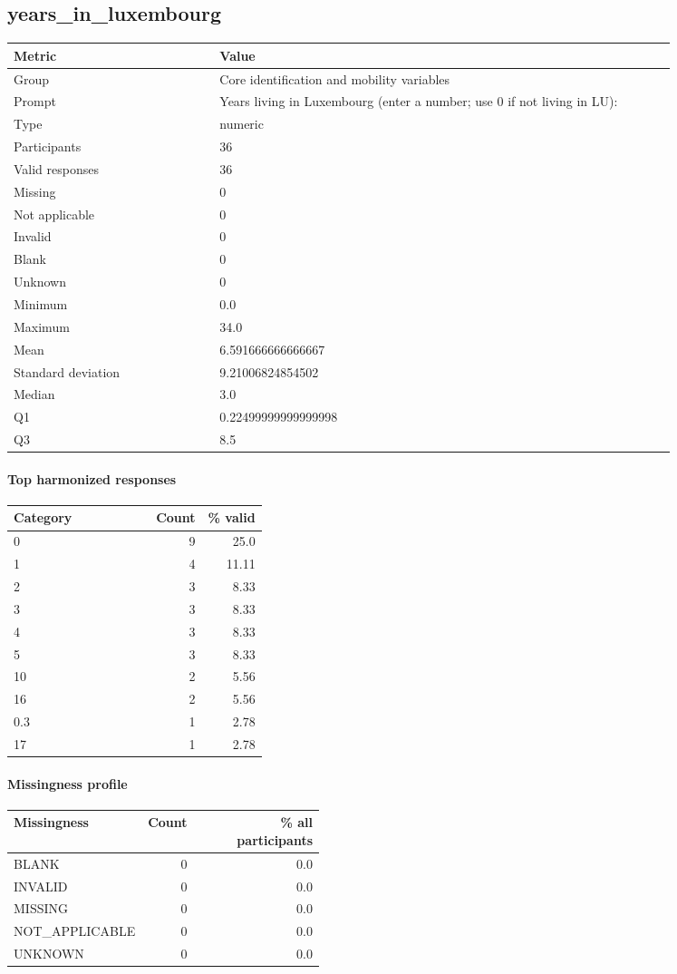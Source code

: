 \subsection*{years\_in\_luxembourg}
\begin{tabular}{p{0.28\linewidth}p{0.62\linewidth}}
\toprule
Metric & Value\\
\midrule
Group & Core identification and mobility variables\\
Prompt & Years living in Luxembourg (enter a number; use 0 if not living in LU):\\
Type & numeric\\
Participants & 36\\
Valid responses & 36\\
Missing & 0\\
Not applicable & 0\\
Invalid & 0\\
Blank & 0\\
Unknown & 0\\
Minimum & 0.0\\
Maximum & 34.0\\
Mean & 6.591666666666667\\
Standard deviation & 9.21006824854502\\
Median & 3.0\\
Q1 & 0.22499999999999998\\
Q3 & 8.5\\
\bottomrule
\end{tabular}

\paragraph{Top harmonized responses}
\begin{tabular}{p{0.56\linewidth}rr}
\toprule
Category & Count & \% valid\\
\midrule
0 & 9 & 25.0\\
1 & 4 & 11.11\\
2 & 3 & 8.33\\
3 & 3 & 8.33\\
4 & 3 & 8.33\\
5 & 3 & 8.33\\
10 & 2 & 5.56\\
16 & 2 & 5.56\\
0.3 & 1 & 2.78\\
17 & 1 & 2.78\\
\bottomrule
\end{tabular}

\paragraph{Missingness profile}
\begin{tabular}{p{0.40\linewidth}rr}
\toprule
Missingness & Count & \% all participants\\
\midrule
BLANK & 0 & 0.0\\
INVALID & 0 & 0.0\\
MISSING & 0 & 0.0\\
NOT\_APPLICABLE & 0 & 0.0\\
UNKNOWN & 0 & 0.0\\
\bottomrule
\end{tabular}


